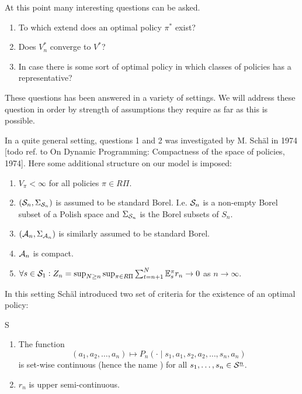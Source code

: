 \documentclass{article}
\begin{document}
At this point many interesting questions can be asked.
\begin{enumerate}
  \item To which extend does an optimal policy $\pi^*$ exist?
  \item Does $V_n^*$ converge to $V^*$?
  \item In case there is some sort of optimal policy
    in which classes of policies has a representative?
\end{enumerate}
These questions has been answered in a variety of settings.
We will address these question in order by strength of assumptions
they require as far as this is possible.

In a quite general setting, questions 1 and 2
was investigated by M. Schäl in 1974
[todo ref. to On Dynamic Programming:
Compactness of the space of policies, 1974].
Here some additional structure on our model is imposed:
\begin{sett}[Schäl]
  \begin{enumerate}
    \item $V_\pi < \infty$ for all policies $\pi \in R\Pi$.
    \item $(\mathcal{S}_n, \Sigma_{\mathcal{S}_n})$ is assumed to be standard Borel.
      I.e. $\mathcal{S}_n$ is a non-empty Borel subset of a Polish space
      and $\Sigma_{\mathcal{S}_n}$ is the Borel subsets of $S_n$.
    \item $(\mathcal{A}_n, \Sigma_{\mathcal{A}_n})$ is similarly assumed to be
      standard Borel.
    \item $\mathcal{A}_n$ is compact.
    \item $\forall s \in \mathcal{S}_1 :
      Z_n = \sup_{N \geq n} \sup_{\pi \in R\Pi} \sum_{t=n+1}^N
      \mathbb{E}_s^\pi r_n \to 0$ as $n \to \infty$.
  \end{enumerate}
  \label{sett:Schal}
\end{sett}

In this setting Schäl introduced two set of criteria for the existence
of an optimal policy:

\begin{cond}{S}
  \begin{enumerate}
    \item The function \[
	(a_1, a_2, \dots, a_n) \mapsto
	P_n(\cdot \mid s_1, a_1, s_2, a_2, \dots, s_n, a_n)
      \]
      is set-wise continuous (hence the name )
      for all $s_1, \dots, s_n \in \mathcal{S}^{\underline{n}}$.
    \item $r_n$ is upper semi-continuous.
  \end{enumerate}
  \label{cond:S}
\end{cond}
\end{document}
